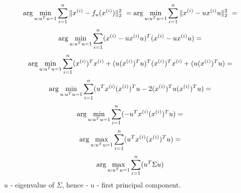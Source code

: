 \begin{answer}
$$ \arg \min_{u:u^Tu=1} \sum_{i=1}^{n} \|x^{(i)}-f_u(x^{(i)})\|_2^2 \  =  \arg \min_{u:u^Tu=1} \sum_{i=1}^{n} \|x^{(i)}-ux^{(i)}u\|_2^2 \  =$$
$$ \arg \min_{u:u^Tu=1} \sum_{i=1}^{n} (x^{(i)}-ux^{(i)}u)^T(x^{(i)}-ux^{(i)}u)  = $$
$$ \arg \min_{u:u^Tu=1} \sum_{i=1}^{n} (x^{(i)})^{T} x^{(i)} + (u(x^{(i)})^{T}u)^{T} (x^{(i)})^{T} x^{(i)} + (u(x^{(i)})^{T}u) = $$
$$  \arg \min_{u:u^Tu=1} \sum_{i=1}^{n} (u^Tx^{(i)} (x^{(i)})^Tu - 2(x^{(i)})^Tu(x^{(i)})^Tu)= $$
$$  \arg \min_{u:u^Tu=1} \sum_{i=1}^{n} (-u^Tx^{(i)} (x^{(i)})^Tu)= $$
$$  \arg \max_{u:u^Tu=1} \sum_{i=1}^{n} (u^Tx^{(i)} (x^{(i)})^Tu)= $$
$$  \arg \max_{u:u^Tu=1} \sum_{i=1}^{n} (u^T\Sigma u) $$
$u$ - eigenvalue of $\Sigma$, hence - $u$ - first principal component.
\end{answer}